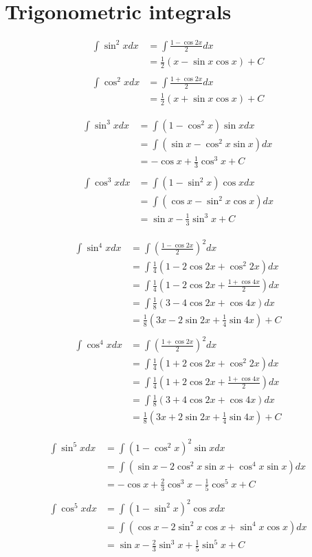 \documentclass{article}
\begin{document}
\section{Trigonometric integrals}

\begin{align*}
\int \sin^2{x} dx
  &= \int \frac{1-\cos{2x}}{2} dx \\
  &= \frac{1}{2}(x - \sin{x}\cos{x}) + C
\\\\
\int \cos^2{x} dx
  &= \int \frac{1+\cos{2x}}{2} dx \\
  &= \frac{1}{2}(x + \sin{x}\cos{x}) + C
\end{align*}

\begin{align*}
\int \sin^3{x} dx
  &= \int (1-\cos^2{x})\sin{x} dx \\
  &= \int (\sin{x} - \cos^2{x}\sin{x}) dx \\
  &= -\cos{x} + \frac{1}{3}\cos^3{x} + C
\\\\
\int \cos^3{x} dx
  &= \int (1-\sin^2{x})\cos{x} dx \\
  &= \int (\cos{x} - \sin^2{x}\cos{x}) dx \\
  &= \sin{x} - \frac{1}{3}\sin^3{x} + C
\end{align*}

\begin{align*}
\int \sin^4{x} dx
  &= \int \left(\frac{1 -\cos{2x}}{2}\right)^2 dx \\
  &= \int \frac{1}{4}(1 - 2\cos{2x} + \cos^2{2x}) dx \\
  &= \int \frac{1}{4}(1 - 2\cos{2x} + \frac{1 + \cos{4x}}{2}) dx \\
  &= \int \frac{1}{8}(3 - 4\cos{2x} + \cos{4x}) dx \\
  &= \frac{1}{8}(3x - 2\sin{2x} + \frac{1}{4}\sin{4x}) + C
\\\\
\int \cos^4{x} dx
  &= \int \left(\frac{1 +\cos{2x}}{2}\right)^2 dx \\
  &= \int \frac{1}{4}(1 + 2\cos{2x} + \cos^2{2x}) dx \\
  &= \int \frac{1}{4}(1 + 2\cos{2x} + \frac{1 + \cos{4x}}{2}) dx \\
  &= \int \frac{1}{8}(3 + 4\cos{2x} + \cos{4x}) dx \\
  &= \frac{1}{8}(3x + 2\sin{2x} + \frac{1}{4}\sin{4x}) + C
\end{align*}

\begin{align*}
\int \sin^5{x} dx
  &= \int (1 - \cos^2{x})^2\sin{x} dx \\
  &= \int (\sin{x} - 2\cos^2{x}\sin{x} + \cos^4{x}\sin{x}) dx \\
  &= -\cos{x} + \frac{2}{3}\cos^3{x} - \frac{1}{5}\cos^5{x} + C
\\\\
\int \cos^5{x} dx
  &= \int (1 - \sin^2{x})^2\cos{x} dx \\
  &= \int (\cos{x} - 2\sin^2{x}\cos{x} + \sin^4{x}\cos{x}) dx \\
  &= \sin{x} - \frac{2}{3}\sin^3{x} + \frac{1}{5}\sin^5{x} + C
\end{align*}
\end{document}
